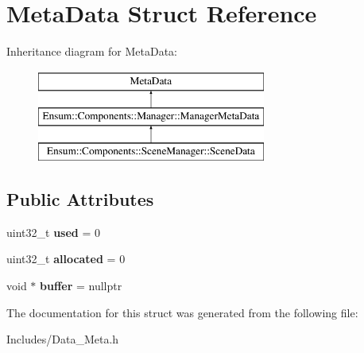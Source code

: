 \hypertarget{struct_meta_data}{}\section{Meta\+Data Struct Reference}
\label{struct_meta_data}
Inheritance diagram for Meta\+Data\+:\begin{figure}[H]
\begin{center}
\leavevmode
\includegraphics[height=3.000000cm]{struct_meta_data}
\end{center}
\end{figure}
\subsection*{Public Attributes}
\begin{DoxyCompactItemize}
\item 
uint32\+\_\+t {\bfseries used} = 0\hypertarget{struct_meta_data_abdcac78a4eaf9c6e69d4fdc0c0f1a1cf}{}\label{struct_meta_data_abdcac78a4eaf9c6e69d4fdc0c0f1a1cf}

\item 
uint32\+\_\+t {\bfseries allocated} = 0\hypertarget{struct_meta_data_ad7f915f404b7b1b3d46a19b0fa6f9a0c}{}\label{struct_meta_data_ad7f915f404b7b1b3d46a19b0fa6f9a0c}

\item 
void $\ast$ {\bfseries buffer} = nullptr\hypertarget{struct_meta_data_a3d09d759d39ddf22e23b3783d82b1c68}{}\label{struct_meta_data_a3d09d759d39ddf22e23b3783d82b1c68}

\end{DoxyCompactItemize}


The documentation for this struct was generated from the following file\+:\begin{DoxyCompactItemize}
\item 
Includes/Data\+\_\+\+Meta.\+h\end{DoxyCompactItemize}
